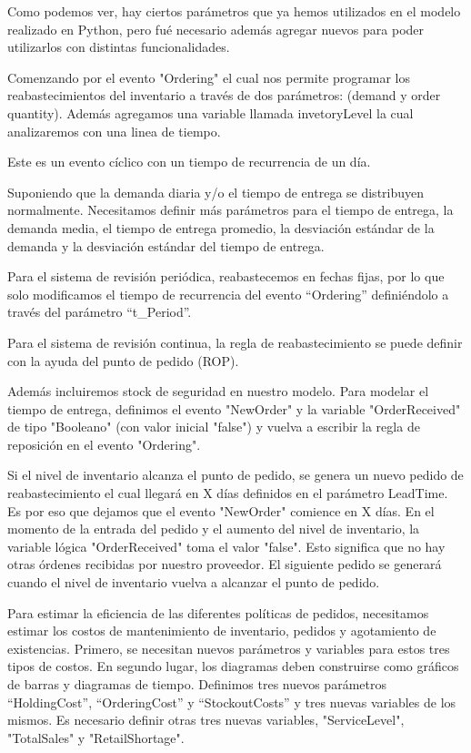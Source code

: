     Como podemos ver, hay ciertos parámetros que ya hemos utilizados en el modelo realizado en Python, pero fué necesario además agregar nuevos para poder utilizarlos con distintas funcionalidades.

    Comenzando por el evento "Ordering" el cual nos permite programar los reabastecimientos del inventario a través de dos parámetros: (demand y order quantity). Además agregamos una variable llamada invetoryLevel la cual analizaremos con una linea de tiempo.

    Este es un evento cíclico con un tiempo de recurrencia de un día.

    Suponiendo que la demanda diaria y/o el tiempo de entrega se distribuyen normalmente.
    Necesitamos definir más  parámetros para el tiempo de entrega, la demanda media, el tiempo de entrega promedio, la desviación estándar de la demanda y la desviación estándar del tiempo de entrega.

    Para el sistema de revisión periódica, reabastecemos en fechas fijas, por lo que solo modificamos el tiempo de recurrencia del evento “Ordering” definiéndolo a través del parámetro “t_Period”.

    Para el sistema de revisión continua, la regla de reabastecimiento se puede definir con la ayuda del punto de pedido (ROP).

    Además incluiremos stock de seguridad en nuestro modelo.
    Para modelar el tiempo de entrega, definimos el evento "NewOrder" y la variable "OrderReceived" de tipo "Booleano" (con valor inicial "false") y vuelva a escribir la regla de reposición en el evento "Ordering".

    Si el nivel de inventario alcanza el punto de pedido, se genera un nuevo pedido de reabastecimiento el cual llegará en X días definidos en el parámetro LeadTime.
    Es por eso que dejamos que el evento "NewOrder" comience en X días. En el momento de la entrada del pedido y el aumento del nivel de inventario, la variable lógica "OrderReceived" toma el valor "false". Esto significa que no hay otras órdenes
    recibidas por nuestro proveedor.
    El siguiente pedido se generará cuando el nivel de inventario vuelva a alcanzar el punto de pedido.

    Para estimar la eficiencia de las diferentes políticas de pedidos, necesitamos estimar los costos de mantenimiento de inventario, pedidos y agotamiento de existencias.
    Primero, se necesitan nuevos parámetros y variables para estos tres tipos de costos. En segundo lugar, los diagramas deben construirse como gráficos de barras y diagramas de tiempo.
    Definimos tres nuevos parámetros “HoldingCost”, “OrderingCost” y “StockoutCosts” y tres nuevas variables de los mismos. Es necesario definir otras tres nuevas variables, "ServiceLevel", "TotalSales" y "RetailShortage".

